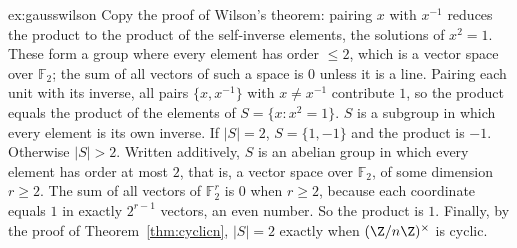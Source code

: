 \begin{solution}{ex:gausswilson}
\idea Copy the proof of Wilson's theorem: pairing $x$ with $x^{-1}$ reduces the product to the product of the self-inverse elements, the solutions of $x^2=1$. These form a group where every element has order $\le2$, which is a vector space over $\mathbb F_2$; the sum of all vectors of such a space is $0$ unless it is a line.
\writeup Pairing each unit with its inverse, all pairs $\{x,x^{-1}\}$ with $x\ne x^{-1}$ contribute $1$, so the product equals the product of the elements of $S=\{x:x^2=1\}$. $S$ is a subgroup in which every element is its own inverse. If $|S|=2$, $S=\{1,-1\}$ and the product is $-1$. Otherwise $|S|>2$. Written additively, $S$ is an abelian group in which every element has order at most $2$, that is, a vector space over $\mathbb F_2$, of some dimension $r\ge2$. The sum of all vectors of $\mathbb F_2^r$ is $0$ when $r\ge2$, because each coordinate equals $1$ in exactly $2^{r-1}$ vectors, an even number. So the product is $1$. Finally, by the proof of Theorem~\ref{thm:cyclicn}, $|S|=2$ exactly when $(\Z/n\Z)^\times$ is cyclic.
\end{solution}

